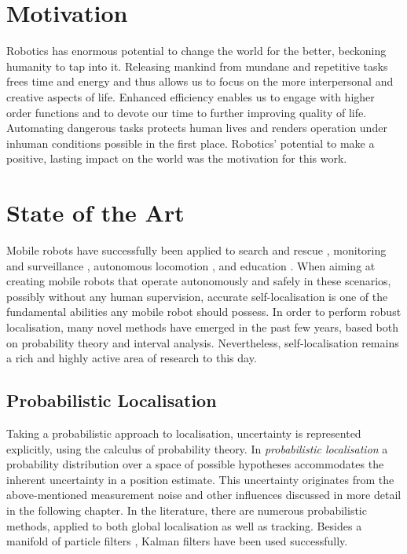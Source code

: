 \section{Motivation}

Robotics has enormous potential to change the world for the better, beckoning humanity to tap into it. Releasing mankind from mundane and repetitive tasks frees time and energy and thus allows us to focus on the more interpersonal and creative aspects of life. Enhanced efficiency enables us to engage with higher order functions and to devote our time to further improving quality of life. Automating dangerous tasks protects human lives and renders operation under inhuman conditions possible in the first place. Robotics' potential to make a positive, lasting impact on the world was the motivation for this work. 

\section{State of the Art}

Mobile robots have successfully been applied to search and rescue \cite{s17102426, 7485707, Beck:2016:OPC:2936924.2937074, voyles2008search, shah2004survey}, monitoring and surveillance \cite{dunbabin2012robots}, autonomous locomotion \cite{bresson2017simultaneous, vivacqua2017low}, and education \cite{crnokic_applications}. When aiming at creating mobile robots that operate autonomously and safely in these scenarios, possibly without any human supervision, accurate self-localisation is one of the fundamental abilities any mobile robot should possess. In order to perform robust localisation, many novel methods have emerged in the past few years, based both on probability theory and interval analysis. Nevertheless, self-localisation remains a rich and highly active area of research to this day. 

\subsection{Probabilistic Localisation}

Taking a probabilistic approach to localisation, uncertainty is represented explicitly, using the calculus of probability theory. In \emph{probabilistic localisation} a probability distribution over a space of possible hypotheses accommodates the inherent uncertainty in a position estimate. This uncertainty originates from the above-mentioned measurement noise and other influences discussed in more detail in the following chapter. In the literature, there are numerous probabilistic methods, applied to both global localisation as well as tracking. Besides a manifold of particle filters \cite{ko2012particle, THRUN200199, roumeliotis2000, yong_better_proposal2001}, Kalman filters \cite{jensfelt_globalloc2001, roumeliotis2000} have been used successfully.  


